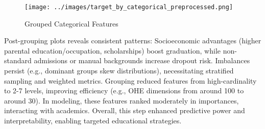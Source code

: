 \documentclass[twoside,final]{hcmut-report}
\begin{document}
\begin{figure}[H]
  \centering
  \texttt{[image: ../images/target\_by\_categorical\_preprocessed.png]}
  \caption{Grouped Categorical Features}
  \label{grouped_cat}
\end{figure}

Post-grouping plots reveals consistent patterns: Socioeconomic advantages (higher parental education/occupation, scholarships) boost graduation, while non-standard admissions or manual backgrounds increase dropout risk. Imbalances persist (e.g., dominant groups skew distributions), necessitating stratified sampling and weighted metrics. Grouping reduced features from high-cardinality to 2-7 levels, improving efficiency (e.g., OHE dimensions from around 100 to around 30). In modeling, these features ranked moderately in importances, interacting with academics. Overall, this step enhanced predictive power and interpretability, enabling targeted educational strategies.
\end{document}
